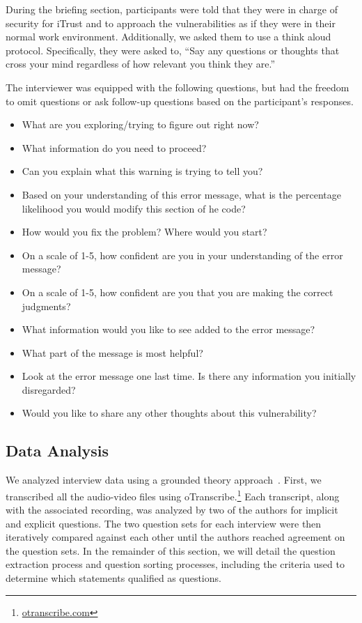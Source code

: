 \documentclass[conference]{IEEEtran}
\begin{document}
During the briefing section, participants were told that they were in charge of security for iTrust and to approach the vulnerabilities as if they were in their normal work environment.
Additionally, we asked them to use a think aloud protocol. Specifically, they were asked to, ``Say any questions or thoughts that cross your mind regardless of how relevant you think they are.''

The interviewer was equipped with the following questions, but had the freedom to omit questions or ask follow-up questions based on the participant's responses.
\begin{itemize}
\item What are you exploring/trying to figure out right now?
\item What information do you need to proceed?
\item Can you explain what this warning is trying to tell you?
\item Based on your understanding of this error message, what is the percentage likelihood you would modify this section of he code?
\item How would you fix the problem? Where would you start?
\item On a scale of 1-5, how confident are you in your understanding of the error message?
\item On a scale of 1-5, how confident are you that you are making the correct judgments?
\item What information would you like to see added to the error message?
\item What part of the message is most helpful?
\item Look at the error message one last time. Is there any information you initially disregarded?
\item Would you like to share any other thoughts about this vulnerability?
\end{itemize}

\subsection{Data Analysis}
\label{dataAnalysis}
We analyzed interview data using a grounded theory approach~\cite{glaser2009discovery}. 
First, we transcribed all the audio-video files using oTranscribe.\footnote{\url{otranscribe.com}}
Each transcript, along with the associated recording, was analyzed by two of the authors for implicit and explicit questions. 
The two question sets for each interview were then iteratively compared against each other until the authors reached agreement on the question sets. 
In the remainder of this section, we will detail the question extraction process and question sorting processes, including the criteria used to determine which statements qualified as questions.
\end{document}
